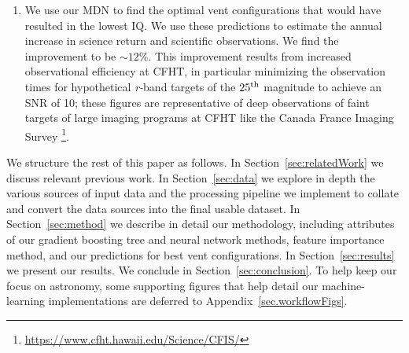 \begin{enumerate}
 \item We use our MDN to find the optimal vent configurations that would have resulted in the lowest IQ. We use these predictions to estimate the annual increase in science return and scientific observations.  We find the improvement to be $\sim 12\%$. This improvement results from increased observational efficiency at CFHT, in particular minimizing the observation times for hypothetical \textit{r-}band targets of the $25^{\rm th}$ magnitude to achieve an SNR of 10; these figures are representative of deep observations of faint targets of large imaging programs at CFHT like the Canada France Imaging Survey \footnote{\url{https://www.cfht.hawaii.edu/Science/CFIS/}}.
\end{enumerate}

We structure the rest of this paper as follows. In Section~\ref{sec:relatedWork} we discuss relevant previous work. In Section~\ref{sec:data} we explore in depth the various sources of input data and the processing pipeline we implement to collate and convert the data sources into the final usable dataset. In Section~\ref{sec:method} we describe in detail our methodology, including attributes of our gradient boosting tree and neural network methods, feature importance method, and our predictions for best vent configurations. In Section~\ref{sec:results} we present our results. We conclude in Section~\ref{sec:conclusion}.  To help keep our focus on astronomy, some supporting figures that help detail our machine-learning implementations are deferred to Appendix~\ref{sec.workflowFigs}.



